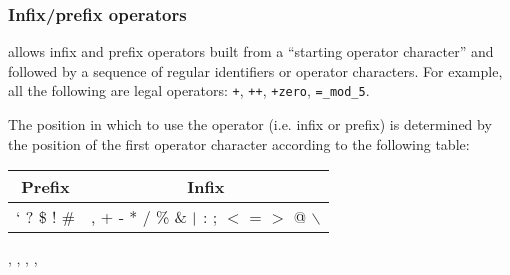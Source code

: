 \subsubsection{Infix/prefix operators}

{\focal} allows infix and prefix operators built from a
``starting operator character'' and followed by a sequence of
regular identifiers or operator characters. For example, all the
following are legal operators:
{\tt +}, {\tt ++}, {\tt \tilde+zero}, {\tt =\_mod\_5}.

The position in which to use the operator (i.e. infix or prefix)
is determined by the position of the first operator character
according to the following table:
\begin{center}
\begin{tabular}{|c|c|}
\hline
Prefix & Infix \\
\hline
` \tilde{} ? \$ ! \# &
, + - * / \% \& $\vertical$ : ; $<$ = $>$ @ \chapeau{} $\backslash$ \\
\hline
\end{tabular}
\end{center}

\begin{syn}
 \is
   \orelse \tok{\tilde} \orelse {} \orelse \tok{\$} \orelse
  \tok{!} \orelse \tok{\#}
\sep
{} \is
  \tok{,} \orelse \tok{+} \orelse \tok{-} \orelse \tok{*} \orelse
  \tok{/} \orelse \tok{\%} \orelse \tok{\&} \orelse \tok{\vertical} \orelse
  \tok{:} \orelse \tok{;} \orelse \tok{<} \orelse \tok{=} \orelse
  \tok{>} \orelse {} \orelse \tok{\chapeau} \orelse
  \tok{\backslash}
\sep
{} \is
   
\sep
{} \is
   
\sep
{} \is
   \orelse {}
\end{syn}


